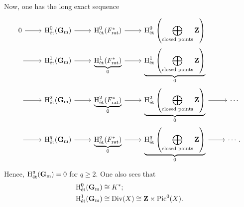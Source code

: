 \documentclass [11 pt, oneside] {article}
\begin{document}
Now, one has the long exact sequence
\[
\begin{tikzcd}[row sep = 0 em]
	0\ar[r] & \etco^{0}(\mathbf{G}\sub{m}) \ar[r] & \etco ^{0}(\mathscr{F}\sub{rat}^{*}) \ar[r] & \displaystyle\etco^{0}\left( \bigoplus_{\textrm{closed points}} \mathbf{Z} \right) \\
		\text{}\ar[r]&\etco^{1}(\mathbf{G}\sub{m})\ar[r] & \underbrace{\etco ^{1}(\mathscr{F}\sub{rat}^{*})}_{0} \ar[r] & \displaystyle\underbrace{\etco^{1}\left( \bigoplus_{\textrm{closed points}} \mathbf{Z} \right)}_{0} \\
		\text{}\ar[r]&\etco^{2}(\mathbf{G}\sub{m})\ar[r] & \underbrace{\etco ^{2}(\mathscr{F}\sub{rat}^{*})}_{0} \ar[r] & \displaystyle\underbrace{\etco^{2}\left( \bigoplus_{\textrm{closed points}} \mathbf{Z} \right)}_{0} \ar[r] & \cdots\\
		\text{}\ar[r]&\etco^{q}(\mathbf{G}\sub{m})\ar[r] & \underbrace{\etco ^{q}(\mathscr{F}\sub{rat}^{*})}_{0} \ar[r] & \displaystyle\underbrace{\etco^{q}\left( \bigoplus_{\textrm{closed points}} \mathbf{Z} \right)}_{0} \ar[r] & \cdots.
\end{tikzcd}
\]
Hence, $\operatorname{H}_{\textup {\'et}}^{q}(\mathbf{G}_{\textup {m}}) = 0$ for $q\ge 2$. One also sees that
\begin{align*}
	\operatorname{H}_{\textup {\'et}}^{0}(\mathbf{G}_{\textup {m}}) &\cong K^{*};\\
	\operatorname{H}_{\textup {\'et}}^{1}(\mathbf{G}_{\textup {m}}) & \cong \operatorname{Div}(X)\cong \mathbf{Z}\times \operatorname{Pic}^0(X).
\end{align*}
\end{document}

